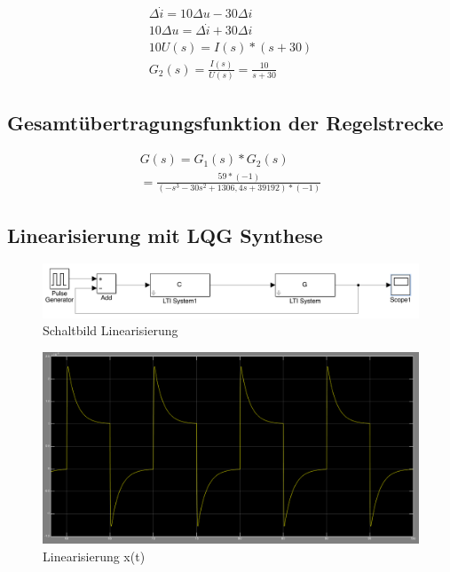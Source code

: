 \documentclass[10pt,a4paper]{article}
\begin{document}
\begin{figure}[H]
  \begin{align}
	  \Delta\dot{i} = 10 \Delta u -30 \Delta i \nonumber \\
	  10 \Delta u = \Delta \dot{i} + 30 \Delta i \nonumber \\
	  10 U(s) = I(s) * (s + 30) \nonumber \\
	  G_2(s) = \frac{I(s)}{U(s)} = \frac{10}{s + 30} \nonumber
  \end{align}
\end{figure}



\subsection{Gesamtübertragungsfunktion der Regelstrecke}
\begin{figure}[H]
  \begin{align}
	  G(s) = G_1(s) * G_2(s) \nonumber \\
	  = \frac{59 * (-1)}{(-s^3 -30s^2 + 1306,4s + 39192) * (-1)} \nonumber
  \end{align}
\end{figure}

\subsection{Linearisierung mit LQG Synthese}

\begin{figure}[H]
\centering
\includegraphics[width=1\linewidth]{screens/linearisiert}
\caption{Schaltbild Linearisierung}
\label{fig:linearisiert}
\end{figure}

\begin{figure}[H]
\centering
\includegraphics[width=0.7\linewidth]{screens/linearisiert_x(t)}
\caption{Linearisierung x(t)}
\label{fig:linearisiert_xt}
\end{figure}
\end{document}
